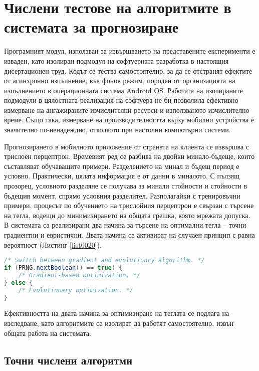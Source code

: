 \chapter{Числени тестове на алгоритмите в системата за прогнозиране}

Програмният модул, използван за извършването на представените експерименти е изваден, като изолиран подмодул на софтуерната разработка в настоящия дисертационен труд. Кодът се тества самостоятелно, за да се отстранят ефектите от асинхронно изпълнение, във фонов режим, породен от организацията на изпълнението в операционната система Android OS. Работата на изолираните подмодули в цялостната реализация на софтуера не би позволила ефективно измерване на ангажираните изчислителни ресурси и използваното изчислително време. Също така, измерване на производителността върху мобилни устройства е значително по-ненадеждно, отколкото при настолни компютърни системи. 

Прогнозирането в мобилното приложение от страната на клиента се извършва с трислоен перцептрон. Времевият ред се разбива на двойки минало-бъдеще, които съставляват обучаващите примери. Разделението на минал и бъдещ период е условно. Практически, цялата информация е от данни в миналото. С пълзящ прозорец, условното разделяне се получава за минали стойности и стойности в бъдещия момент, спрямо условния разделител. Разполагайки с тренировъчни примери, процесът по обучението на трислойния перцептрон е свързан с търсене на тегла, водещи до минимизирането на общата грешка, която мрежата допуска. В системата са реализирани два начина за търсене на оптимални тегла – точни градиентни и евристични. Двата начина се активират на случаен принцип с равна вероятност (Листинг \ref{list0020}).

\begin{lstlisting}[caption=Превключване на алгоритмите за обучение, language=Java, basicstyle=\tiny, label=list0020]
/* Switch between gradient and evolutionry algorithm. */
if (PRNG.nextBoolean() == true) {
	/* Gradient-based optimization. */
} else {
	/* Evolutionary optimization. */
}
\end{lstlisting}

Ефективността на двата начина за оптимизиране на теглата се подлага на изследване, като алгоритмите се изолират да работят самостоятелно, извън общата работа на системата. 

\section{Точни числени алгоритми}


